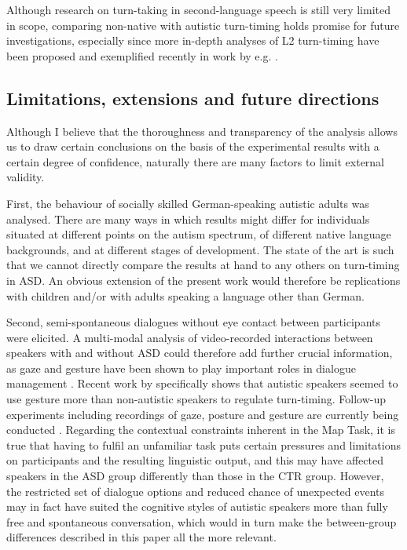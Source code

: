 Although research on turn-taking in second-language speech is still very limited in scope, comparing non-native with autistic turn-timing holds promise for future investigations, especially since more in-depth analyses of L2 turn-timing have been proposed and exemplified recently in work by e.g. \citet{sbrannaQuantifyingL2Interactional2021,sbrannaDevelopingL2Interactional2021}.

\subsection{Limitations, extensions and future directions}\label{turntaking_conclusion_discussion_limitations}



Although I believe that the thoroughness and transparency of the analysis allows us to draw certain conclusions on the basis of the experimental results with a certain degree of confidence, naturally there are many factors to limit external validity.

First, the behaviour of socially skilled German-speaking autistic adults was analysed. There are many ways in which results might differ for individuals situated at different points on the autism spectrum, of different native language backgrounds, and at different stages of development. The state of the art is such that we cannot directly compare the results at hand to any others on turn-timing in ASD. An obvious extension of the present work would therefore be replications with children and/or with adults speaking a language other than German.

Second, semi-spontaneous dialogues without eye contact between participants were elicited. A multi-modal analysis of video-recorded interactions between speakers with and without ASD could therefore add further crucial information, as gaze and gesture have been shown to play important roles in dialogue management \citep[e.g.][]{mondadaContemporaryIssuesConversation2019,auerGazeAddresseeSelection2018,mcclearyTurntakingBrazilianSign2013,hollerProcessingLanguageFacetoface2018,zellersProsodyHandGesture2016,bohusFacilitatingMultipartyDialog2010}. Recent work by \citet{demarchenaAtypicalitiesGestureForm2019} specifically shows that autistic speakers seemed to use gesture more than non-autistic speakers to regulate turn-timing. Follow-up experiments including recordings of gaze, posture and gesture are currently being conducted \citep{spaniolMultimodalSignallingInterplay2023}. Regarding the contextual constraints inherent in the Map Task, it is true that having to fulfil an unfamiliar task puts certain pressures and limitations on participants and the resulting linguistic output, and this may have affected speakers in the ASD group differently than those in the CTR group. However, the restricted set of dialogue options and reduced chance of unexpected events may in fact have suited the cognitive styles of autistic speakers more than fully free and spontaneous conversation, which would in turn make the between-group differences described in this paper all the more relevant.

